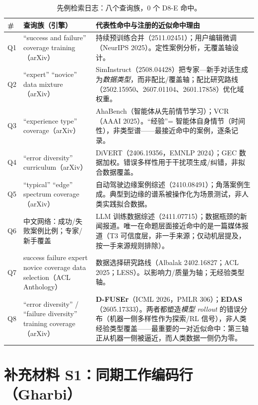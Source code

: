 \documentclass[10pt,fontset=fandol]{ctexart}
\begin{document}
\begin{table}[h]
\centering
\caption{先例检索日志：八个查询族，0 个 D8-E 命中。}
\label{tab:absence}
\footnotesize
\begin{tabular}{p{}p{}p{}}
\toprule
\# & 查询族（引擎） & 代表性命中与注册的近似命中理由 \\
\midrule
Q1 & “success and failure” coverage training（arXiv） & 持续预训练合并（2511.02451）；用户编辑微调（NeurIPS 2025）。定性案例分析，无覆盖轴设计。 \\
Q2 & “expert” “novice” data mixture（arXiv） & SimInstruct（2508.04428）把专家—新手对话生成为\emph{数据类型}，而非配比/覆盖轴；配比研究路线（2502.15950、2607.01104、2601.17858）优化域权重。 \\
Q3 & “experience type” coverage（arXiv） & AhaBench（智能体从先前情节学习）；VCR（AAAI 2025）。“经验”= 智能体自身情节（时间性），非类型谱——最接近命中的案例，逐条记录。 \\
Q4 & “error diversity” curriculum（arXiv） & DiVERT（2406.19356，EMNLP 2024）；GEC 数据加权。错误多样性用于干扰项生成/纠错，非拟合数据覆盖。 \\
Q5 & “typical” “edge” spectrum coverage（arXiv） & 自动驾驶边缘案例综述（2410.08491）；角落案例生成。典型到边缘的谱系被操作化为场景测试，非人类实践拟合数据。 \\
Q6 & 中文网络：成功/失败案例比例；专家/新手覆盖 & LLM 训练数据综述（2411.07715）；数据瓶颈的新闻报道。唯一在命题层面接近命中的是一篇媒体报道（T3 可信度层，非一手来源；仅动机层提及，按一手来源规则排除）。 \\
Q7 & success failure expert novice coverage data selection（ACL Anthology） & 数据选择研究路线（Albalak 2402.16827；ACL 2025；LESS）。以影响力/质量为轴；无经验类型轴。 \\
Q8 & “error diversity” / “failure diversity” training coverage（arXiv） & \textbf{D-FUSEr}（ICML 2026，PMLR 306）；\textbf{EDAS}（2605.17333）。两者都塑造\emph{模型 rollout} 的错误分布（机器一侧多样性作为探索/RL 信号），非人类经验类型覆盖——最重要的一对近似命中：第三轴正从机器一侧被逼近，而人类数据一侧仍为零。 \\
\bottomrule
\end{tabular}
\end{table}

\section{补充材料 S1：同期工作编码行（Gharbi）}\label{sec:appendix-gharbi}
\end{document}
